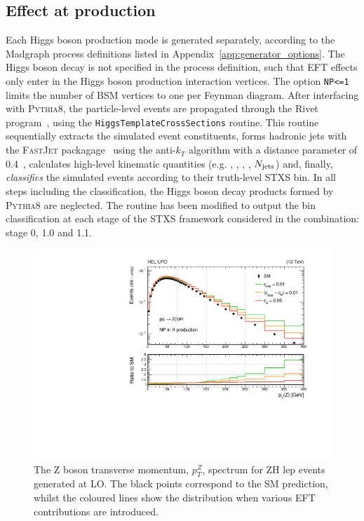 \subsection{Effect at production}
Each Higgs boson production mode is generated separately, according to the Madgraph process definitions listed in Appendix~\ref{app:generator_options}. The Higgs boson decay is not specified in the process definition, such that EFT effects only enter in the Higgs boson production interaction vertices. The option \texttt{NP<=1} limits the number of BSM vertices to one per Feynman diagram. After interfacing with \textsc{Pythia8}, the particle-level events are propagated through the Rivet program~\cite{Buckley:2010ar}, using the \texttt{HiggsTemplateCrossSections} routine. This routine sequentially extracts the simulated event constituents, forms hadronic jets with the \textsc{FastJet} packagage~\cite{} using the anti-$k_T$ algorithm with a distance parameter of 0.4~\cite{Cacciari:2008gp}, calculates high-level kinematic quantities (e.g. \ptH, \ptV, \ptHjj, \mjj, $N_{\rm{jets}}$) and, finally, \textit{classifies} the simulated events according to their truth-level STXS bin. In all steps including the classification, the Higgs boson decay products formed by \textsc{Pythia8} are neglected. The routine has been modified to output the bin classification at each stage of the STXS framework considered in the combination: stage 0, 1.0 and 1.1.

\begin{figure}[htb!]
  \centering
  \includegraphics[width=.8\textwidth]{Figures/eft/distributions/HEL_PTZ.pdf}
  \caption[Transverse momentum of Z boson for ZH lep events with HEL contributions]
  {
    The Z boson transverse momentum, $p_T^Z$, spectrum for ZH lep events generated at LO. The black points correspond to the SM prediction, whilst the coloured lines show the distribution when various EFT contributions are introduced.
  }
  \label{fig:zhlep_ptv}
\end{figure}

